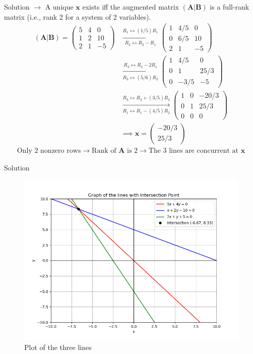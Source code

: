 \documentclass{beamer}
\numberwithin{equation}{section}
\providecommand{\brak}[1]{\ensuremath{\left(#1\right)}}
\theoremstyle{remark}
\newcommand{\myvec}[1]{\ensuremath{\begin{pmatrix}#1\end{pmatrix}}}
\let\vec\mathbf
\begin{document}
\begin{frame}{Solution}
$\rightarrow$ A unique $\vec{x}$ exists iff the augmented matrix $\brak{\vec{A}|\vec{B}}$ is a full-rank matrix (i.e., rank 2 for a system of 2 variables).
\begin{align}
    \brak{\vec{A}|\vec{B}} = \left(\begin{array}{cc|c}5&4&0\\1&2&10\\2&1&-5\end{array}\right)
    &\xrightarrow[R_2 \leftrightarrow R_2 - R_1]{R_1 \leftrightarrow (1/5)R_1} \left(\begin{array}{cc|c}1&4/5&0\\0&6/5&10\\2&1&-5\end{array}\right) \\
    &\xrightarrow[R_2 \leftrightarrow (5/6)R_2]{R_3 \leftrightarrow R_3 - 2R_1} \left(\begin{array}{cc|c}1&4/5&0\\0&1&25/3\\0&-3/5&-5\end{array}\right) \\
    &\xrightarrow[R_1 \leftrightarrow R_1 - (4/5)R_2]{R_3 \leftrightarrow R_3 + (3/5)R_2} \left(\begin{array}{cc|c}1&0&-20/3\\0&1&25/3\\0&0&0\end{array}\right) \\
    &\implies \vec{x} = \myvec{-20/3\\25/3}
\end{align}
\begin{align*}
    \text{Only 2 nonzero rows}
    \rightarrow \text{Rank of $\vec{A}$ is 2}
    \rightarrow \text{The 3 lines are concurrent at $\vec{x}$}
\end{align*}
\end{frame}

\begin{frame}{Solution}
\begin{figure}[h!]
   \centering
   \includegraphics[width=0.8\linewidth]{figs/01.png}
   \caption{Plot of the three lines}
   \label{Plot_1}
\end{figure}
\end{frame}
\end{document}
